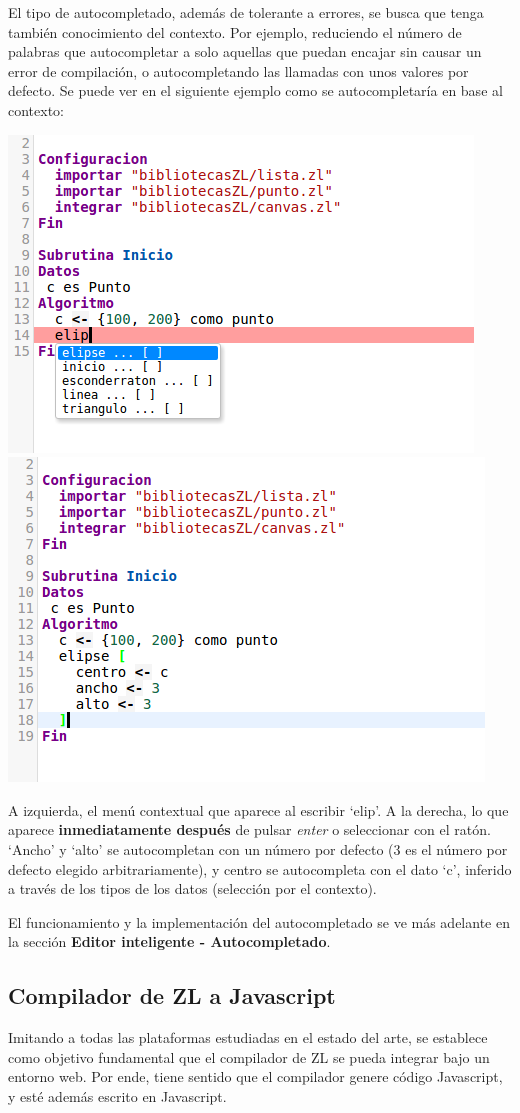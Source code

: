 \documentclass{report}
\begin{document}
	\vspace{10px}

	El tipo de autocompletado, además de tolerante a errores, se busca que tenga también conocimiento del contexto. Por ejemplo, reduciendo el número de palabras que autocompletar a solo aquellas que puedan encajar sin causar un error de compilación, o autocompletando las llamadas con unos valores por defecto. Se puede ver en el siguiente ejemplo como se autocompletaría en base al contexto:
	
	\begin{center}
	\includegraphics[width=0.4\linewidth]{beforecompletion}
	\includegraphics[width=0.4\linewidth]{aftercompletion}
	
	A izquierda, el menú contextual que aparece al escribir `elip'. A la derecha, lo que aparece \textbf{inmediatamente después} de pulsar \textit{enter} o seleccionar con el ratón. `Ancho'  y `alto' se autocompletan con un número por defecto (3 es el número por defecto elegido arbitrariamente), y centro se autocompleta con el dato `c', inferido a través de los tipos de los datos (selección por el contexto).
	\end{center}
	
	El funcionamiento y la implementación del autocompletado se ve más adelante en la sección \textbf{Editor inteligente - Autocompletado}.
	
	\subsection{Compilador de ZL a Javascript}
	
	Imitando a todas las plataformas estudiadas en el estado del arte, se establece como objetivo fundamental que el compilador de ZL se pueda integrar bajo un entorno web. Por ende, tiene sentido que el compilador genere código Javascript, y esté además escrito en Javascript. 
	
\end{document}
